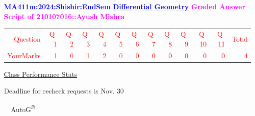 \documentclass{article}                              %
\begin{document}
%
\vspace*{1in}

\begin{center}
	\textbf{\textcolor{blue}{\LARGE MA411m:2024:Shishir:EndSem}}
	\vskip 1cm
	\textbf{\textcolor{blue}{\underline{\Large Differential Geometry}}}
	\vskip 1cm
	\textbf{\textcolor{magenta}{\LARGE Graded Answer Script of 210107016::Ayush Mishra}}
\end{center}


\begin{center}
	\Huge 
	\textcolor{red}{
	\begin{tabular}{*{13}{r}}
		Question&Q-1& Q-2& Q-3& Q-4& Q-5& Q-6& Q-7& Q-8& Q-9& Q-10& Q-11&Total  \\
        	YourMarks&1&0&1&2&0&0&0&0&0&0&0&4
	\end{tabular}
	}
        \vskip 2cm
	\large
	\underline{Class Performance Stats}
	\DTLsetseparator{;}
	\begin{table}[htbp]
		\centering
	\end{table}
	\vskip 1cm
	Deadline for recheck requests is Nov. 30
\end{center}
\ \vfill \ \hfill \small AutoG\textsuperscript{\copyright}
\newpage
%
\end{document}
